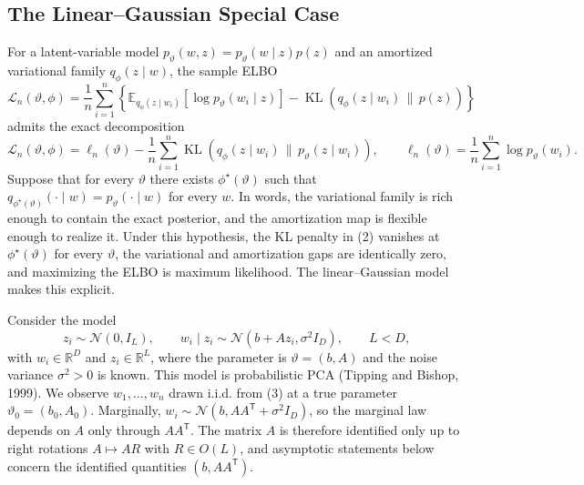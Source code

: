 \documentclass[11pt]{article}
\DeclareMathOperator{\KL}{KL}
\newcommand{\E}{\mathbb{E}}
\newcommand{\R}{\mathbb{R}}
\newcommand{\N}{\mathcal{N}}
\newcommand{\trans}{\mathsf{T}}
\theoremstyle{remark}
\begin{document}
\subsection{The Linear--Gaussian Special Case}

For a latent-variable model $p_\vartheta(w,z)=p_\vartheta(w\mid z)p(z)$ and an amortized variational family $q_\phi(z\mid w)$, the sample ELBO
\begin{equation}
\mathcal{L}_n(\vartheta,\phi)
=
\frac{1}{n}\sum_{i=1}^n
\left\{
\E_{q_\phi(z\mid w_i)}\!\left[\log p_\vartheta(w_i\mid z)\right]
-
\KL\!\left(q_\phi(z\mid w_i)\,\|\,p(z)\right)
\right\}
\tag{1}
\end{equation}
admits the exact decomposition
\begin{equation}
\mathcal{L}_n(\vartheta,\phi)
=
\ell_n(\vartheta)
-
\frac{1}{n}\sum_{i=1}^n
\KL\!\left(q_\phi(z\mid w_i)\,\|\,p_\vartheta(z\mid w_i)\right),
\qquad
\ell_n(\vartheta)=\frac{1}{n}\sum_{i=1}^n\log p_\vartheta(w_i).
\tag{2}
\end{equation}
Suppose that for every $\vartheta$ there exists $\phi^\star(\vartheta)$ such that
$q_{\phi^\star(\vartheta)}(\cdot\mid w)=p_\vartheta(\cdot\mid w)$ for every $w$. In words, the variational family is rich enough to contain the exact posterior, and the amortization map is flexible enough to realize it. Under this hypothesis, the KL penalty in (2) vanishes at $\phi^\star(\vartheta)$ for every $\vartheta$, the variational and amortization gaps are identically zero, and maximizing the ELBO is maximum likelihood. The linear--Gaussian model makes this explicit.

Consider the model
\begin{equation}
z_i\sim\N(0,I_L),
\qquad
w_i\mid z_i\sim\N(b+Az_i,\sigma^2 I_D),
\qquad
L<D,
\tag{3}
\end{equation}
with $w_i\in\R^D$ and $z_i\in\R^L$, where the parameter is $\vartheta=(b,A)$ and the noise variance $\sigma^2>0$ is known. This model is probabilistic PCA (Tipping and Bishop, 1999). We observe $w_1,\ldots,w_n$ drawn i.i.d. from (3) at a true parameter $\vartheta_0=(b_0,A_0)$. Marginally,
$w_i\sim\N(b,AA^\trans+\sigma^2I_D)$, so the marginal law depends on $A$ only through $AA^\trans$. The matrix $A$ is therefore identified only up to right rotations $A\mapsto AR$ with $R\in O(L)$, and asymptotic statements below concern the identified quantities $(b,AA^\trans)$.
\end{document}
